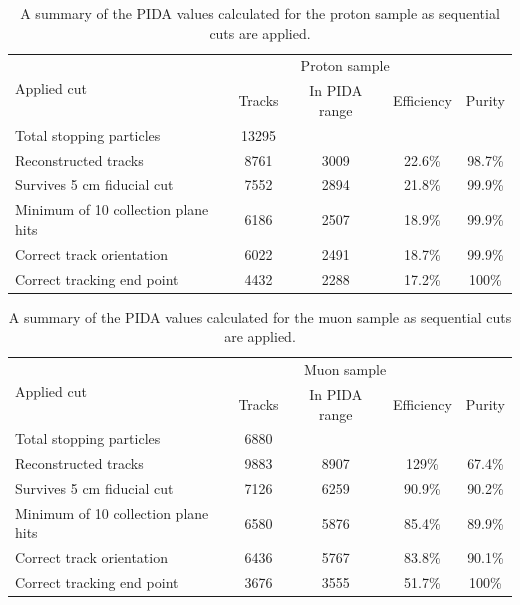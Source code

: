 \begin{table}
  \caption[A summary of the PIDA values calculated for the proton sample as sequential cuts are applied]
          {A summary of the PIDA values calculated for the proton sample as sequential cuts are applied.}
  \centering
  \label{tab:Isol_PIDA_Proton}
  \begin{tabular}{l c c c c}
    \toprule
    \multirow{2}{*}{Applied cut} & \multicolumn{3}{c}{Proton sample} \\ 
    \cmidrule{2-5}
      & Tracks & In PIDA range & Efficiency & Purity \\ 
    \midrule
      Total stopping particles            & 13295 &     &        & \\

      Reconstructed tracks                & 8761 & 3009 & 22.6\% & 98.7\% \\

      Survives 5 cm fiducial cut          & 7552 & 2894 & 21.8\% & 99.9\% \\

      Minimum of 10 collection plane hits & 6186 & 2507 & 18.9\% & 99.9\% \\

      Correct track orientation           & 6022 & 2491 & 18.7\% & 99.9\% \\

      Correct tracking end point          & 4432 & 2288 & 17.2\% & 100\% \\
    \bottomrule
  \end{tabular}
\end{table}

\begin{table}
  \caption[A summary of the PIDA values calculated for the muon sample as sequential cuts are applied]
          {A summary of the PIDA values calculated for the muon sample as sequential cuts are applied.}
  \centering
  \label{tab:Isol_PIDA_Muon}
  \begin{tabular}{l c c c c}
    \toprule
    \multirow{2}{*}{Applied cut} & \multicolumn{3}{c}{Muon sample} \\ 
    \cmidrule{2-5}
      & Tracks & In PIDA range & Efficiency & Purity \\ 
    \midrule
      Total stopping particles            & 6880 &      &        & \\

      Reconstructed tracks                & 9883 & 8907 & 129\%  & 67.4\% \\

      Survives 5 cm fiducial cut          & 7126 & 6259 & 90.9\% & 90.2\% \\

      Minimum of 10 collection plane hits & 6580 & 5876 & 85.4\% & 89.9\% \\

      Correct track orientation           & 6436 & 5767 & 83.8\% & 90.1\% \\

      Correct tracking end point          & 3676 & 3555 & 51.7\% & 100\%  \\
    \bottomrule
  \end{tabular}
\end{table}

